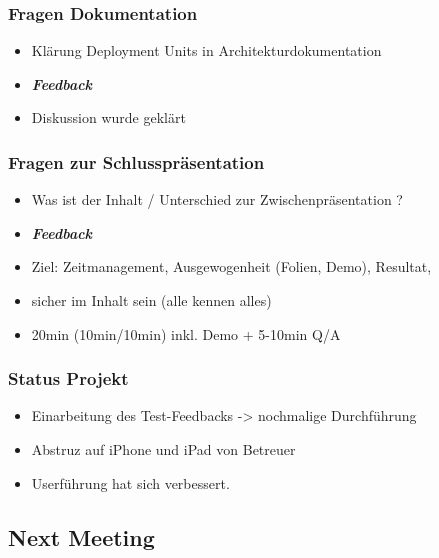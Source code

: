 \hypertarget{fragen-dokumentation}{%
\subsubsection*{Fragen Dokumentation}\label{fragen-dokumentation}}

\begin{itemize}
\item
  Klärung Deployment Units in Architekturdokumentation
\item \emph{\textbf{Feedback}}
\item
  Diskussion wurde geklärt
\end{itemize}

\hypertarget{fragen-zur-schlusspruxe4sentation}{%
\subsubsection*{Fragen zur
Schlusspräsentation}\label{fragen-zur-schlusspruxe4sentation}}

\begin{itemize}
\item
  Was ist der Inhalt / Unterschied zur Zwischenpräsentation ?
\item \emph{\textbf{Feedback}}
\item
  Ziel: Zeitmanagement, Ausgewogenheit (Folien, Demo), Resultat,
\item
  sicher im Inhalt sein (alle kennen alles)
\item
  20min (10min/10min) inkl. Demo + 5-10min Q/A
\end{itemize}

\hypertarget{status-projekt}{%
\subsubsection*{Status Projekt}\label{status-projekt}}

\begin{itemize}
\item
  Einarbeitung des Test-Feedbacks -\textgreater{} nochmalige
  Durchführung
\item
  Abstruz auf iPhone und iPad von Betreuer
\item
  Userführung hat sich verbessert.
\end{itemize}

\hypertarget{next-meeting}{%
\subsection*{Next Meeting}\label{next-meeting}}

